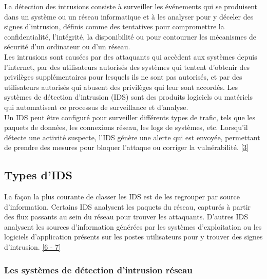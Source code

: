 \vspace{1em}

La détection des intrusions consiste à surveiller les événements qui se produisent dans un système ou un réseau informatique et à les analyser pour y déceler des signes d'intrusion, définis comme des tentatives pour compromettre la confidentialité, l'intégrité, la disponibilité ou pour contourner les mécanismes de sécurité d'un ordinateur ou d'un réseau.\\

Les intrusions sont causées par des attaquants qui accèdent aux systèmes depuis l'internet, par des utilisateurs autorisés des systèmes qui tentent d'obtenir des privilèges supplémentaires pour lesquels ils ne sont pas autorisés, et par des utilisateurs autorisés qui abusent des privilèges qui leur sont accordés. Les systèmes de détection d'intrusion (IDS) sont des produits logiciels ou matériels qui automatisent ce processus de surveillance et d'analyse.\\ 

Un IDS peut être configuré pour surveiller différents types de trafic, tels que les paquets de données, les connexions réseau, les logs de systèmes, etc. Lorsqu'il détecte une activité suspecte, l'IDS génère une alerte qui est envoyée, permettant de prendre des mesures pour bloquer l'attaque ou corriger la vulnérabilité. \hyperref[biblio]{[3]}\\

\vspace{1em}

\subsection{Types d'IDS }

\vspace{1em}

La façon la plus courante de classer les IDS est de les regrouper par source d'information. Certains IDS analysent les paquets du réseau, capturés à partir des flux passants au sein du réseau pour trouver les attaquants. D'autres IDS analysent les sources d'information générées par les systèmes d'exploitation ou les logiciels d'application présents sur les postes utilisateurs pour y trouver des signes d'intrusion. \hyperref[biblio]{[6 - 7]}

\vspace{1em}

\subsubsection{Les systèmes de détection d'intrusion réseau}

